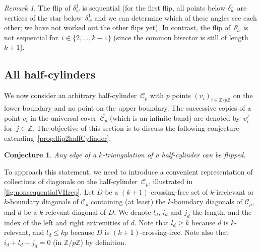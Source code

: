 \documentclass{amsart}
\newtheorem{conjecture}[theorem]{Conjecture}
\theoremstyle{remark}
\newtheorem{remark}[theorem]{Remark}
\newcommand{\Z}{\mathbb{Z}} %
\newcommand{\cylinder}{\mathcal{C}}
\begin{document}
\begin{remark}
The flip of $\delta_w^1$ is sequential (for the first flip, all points below $\delta_w^1$ are vertices of the star below~$\delta_w^1$ and we can determine which of these angles see each other; we have not worked out the other flips yet).
In contrast, the flip of~$\delta_w^i$ is not sequential for~$i \in \{2, \dots, k-1\}$ (since the common bisector is still of length~$k+1$).
\end{remark}


\subsection{All half-cylinders}

We now consider an arbitrary half-cylinder~$\cylinder_p$ with $p$ points $(v_i)_{i \in \Z/p\Z}$ on the lower boundary and no point on the upper boundary. 
The successive copies of a point $v_i$ in the universal cover~$\overline{\cylinder_p}$ (which is an infinite band) are denoted by~$v_i^j$ for~$j \in \Z$.
The objective of this section is to discuss the following conjecture extending~\ref{prop:flip2halfCylinder}.

\begin{conjecture}
\label{thm:flipHalfCylinder}
Any edge of a $k$-triangulation of a half-cylinder can be flipped.
\end{conjecture}

To approach this statement, we need to introduce a convenient representation of collections of diagonals on the half-cylinder~$\cylinder_p$, illustrated in \cref{fig:nonsequentialVHrep}.
Let $D$ be a $(k+1)$-crossing-free set of $k$-irrelevant or $k$-boundary diagonals of $\cylinder_p$ containing (at least) the $k$-boundary diagonals of $\cylinder_p$, and $d$ be a $k$-relevant diagonal of $D$. We denote $l_d$, $i_d$ and $j_d$ the length, and the index of the left and right extremities of $d$. Note that $l_d\geq k$ because $d$ is $k$-relevant, and $l_d \le kp$ because $D$ is $(k+1)$-crossing-free. Note also that $i_d+l_d-j_d=0$ (in $\Z/p\Z$) by definition.
\end{document}
